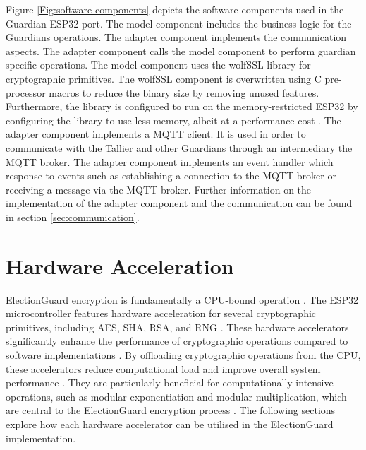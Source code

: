 Figure \ref{Fig:software-components} depicts the software components used in the Guardian ESP32 port. The model component includes the business logic for the Guardians operations. The adapter component implements the communication aspects. The adapter component calls the model component to perform guardian specific operations. The model component uses the wolfSSL library for cryptographic primitives. The wolfSSL component is overwritten using C pre-processor macros to reduce the binary size by removing unused features. Furthermore, the library is configured to run on the memory-restricted ESP32 by configuring the library to use less memory, albeit at a performance cost \cite[56-58]{doxygen}. The adapter component implements a \ac{MQTT} client. It is used in order to communicate with the Tallier and other Guardians through an intermediary the \ac{MQTT} broker. The adapter component implements an event handler which response to events such as establishing a connection to the \ac{MQTT} broker or receiving a message via the \ac{MQTT} broker. Further information on the implementation of the adapter component and the communication can be found in section \ref{sec:communication}. 

\section{Hardware Acceleration} \label{sec:hardware-acceleration}
ElectionGuard encryption is fundamentally a CPU-bound operation \cite[24]{eg-paper}. The ESP32 microcontroller features hardware acceleration for several cryptographic primitives, including \ac{AES}, \ac{SHA}, \ac{RSA}, and \ac{RNG} \cite{esp32-ref}. These hardware accelerators significantly enhance the performance of cryptographic operations compared to software implementations \cite[32]{esp32-series}. By offloading cryptographic operations from the CPU, these accelerators reduce computational load and improve overall system performance \cite[32]{esp32-series}. They are particularly beneficial for computationally intensive operations, such as modular exponentiation and modular multiplication, which are central to the ElectionGuard encryption process \cite[24]{eg-paper}. The following sections explore how each hardware accelerator can be utilised in the ElectionGuard implementation.

